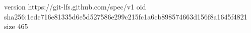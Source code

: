 version https://git-lfs.github.com/spec/v1
oid sha256:1edc716e81335d6e5d527586e299c215fc1a6cb898574663d156f8a1645f4821
size 465
